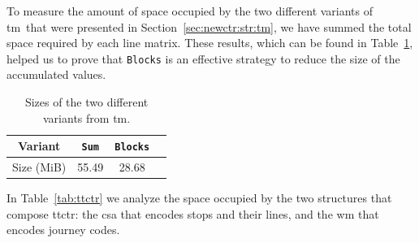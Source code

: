     To measure the amount of space occupied by the two different variants of \gls{tm}~that were presented in Section~\ref{sec:newctr:str:tm}, we have summed the total space required by each line matrix. These results, which can be found in Table~\ref{tab:acuum}, helped us to prove that \texttt{Blocks} is an effective strategy to reduce the size of the accumulated values. %
    
    \begin{table}[ht]
        \centering
        \begin{tabular}{|c|c|c|c|}
        \hline
            Variant & \texttt{Sum} & \texttt{Blocks} \\
            \hline
            Size (MiB) & 55.49 & 28.68 \\
        \hline
        \end{tabular}
        
        \caption{Sizes of the two different variants from \acrshort{tm}.}
        \label{tab:acuum}
    \end{table}
    
    In Table~\ref{tab:ttctr} we analyze the space occupied by the two structures that compose \gls{ttctr}: the \gls{csa} that encodes stops and their lines, and the \gls{wm} that encodes journey codes.
    
